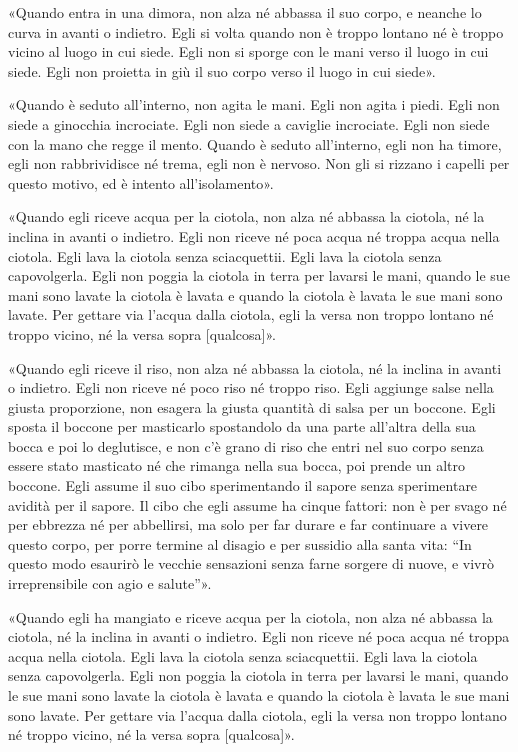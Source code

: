 «Quando entra in una dimora, non alza né abbassa il suo corpo, e
neanche lo curva in avanti o indietro. Egli si volta quando non è troppo
lontano né è troppo vicino al luogo in cui siede. Egli non si sporge con
le mani verso il luogo in cui siede. Egli non proietta in giù il suo
corpo verso il luogo in cui siede».


«Quando è seduto all’interno, non agita le mani. Egli non agita i
piedi. Egli non siede a ginocchia incrociate. Egli non siede a caviglie
incrociate. Egli non siede con la mano che regge il mento. Quando è
seduto all’interno, egli non ha timore, egli non rabbrividisce né trema,
egli non è nervoso. Non gli si rizzano i capelli per questo motivo, ed è
intento all’isolamento».


«Quando egli riceve acqua per la ciotola, non alza né abbassa la
ciotola, né la inclina in avanti o indietro. Egli non riceve né poca
acqua né troppa acqua nella ciotola. Egli lava la ciotola senza
sciacquettii. Egli lava la ciotola senza capovolgerla. Egli non poggia
la ciotola in terra per lavarsi le mani, quando le sue mani sono lavate
la ciotola è lavata e quando la ciotola è lavata le sue mani sono
lavate. Per gettare via l’acqua dalla ciotola, egli la versa non troppo
lontano né troppo vicino, né la versa sopra [qualcosa]».


«Quando egli riceve il riso, non alza né abbassa la ciotola, né la
inclina in avanti o indietro. Egli non riceve né poco riso né troppo
riso. Egli aggiunge salse nella giusta proporzione, non esagera la
giusta quantità di salsa per un boccone. Egli sposta il boccone per
masticarlo spostandolo da una parte all’altra della sua bocca e poi lo
deglutisce, e non c’è grano di riso che entri nel suo corpo senza essere
stato masticato né che rimanga nella sua bocca, poi prende un altro
boccone. Egli assume il suo cibo sperimentando il sapore senza
sperimentare avidità per il sapore. Il cibo che egli assume ha cinque
fattori: non è per svago né per ebbrezza né per abbellirsi, ma solo per
far durare e far continuare a vivere questo corpo, per porre termine al
disagio e per sussidio alla santa vita: “In questo modo esaurirò le
vecchie sensazioni senza farne sorgere di nuove, e vivrò irreprensibile
con agio e salute”».


«Quando egli ha mangiato e riceve acqua per la ciotola, non alza né
abbassa la ciotola, né la inclina in avanti o indietro. Egli non riceve
né poca acqua né troppa acqua nella ciotola. Egli lava la ciotola senza
sciacquettii. Egli lava la ciotola senza capovolgerla. Egli non poggia
la ciotola in terra per lavarsi le mani, quando le sue mani sono lavate
la ciotola è lavata e quando la ciotola è lavata le sue mani sono
lavate. Per gettare via l’acqua dalla ciotola, egli la versa non troppo
lontano né troppo vicino, né la versa sopra [qualcosa]».


